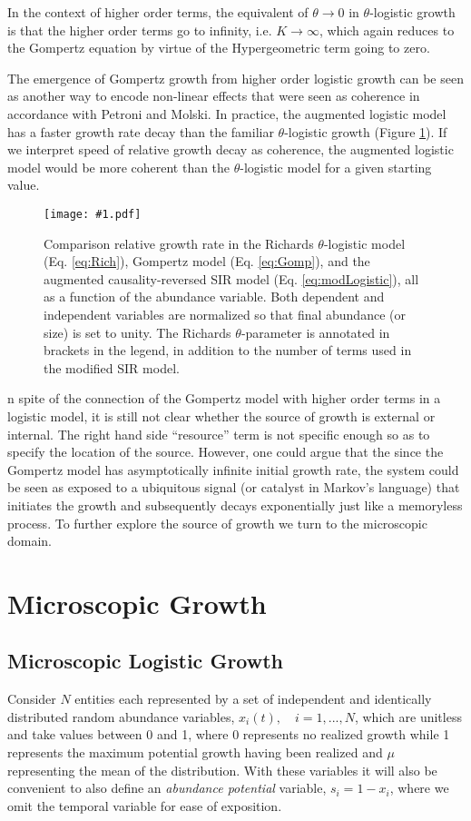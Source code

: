 \documentclass{article}
\newcommand{\insertPdfFig}[3]{
  \begin{figure}[H]
  \centering
  \texttt{[image: \#1.pdf]}
  \caption{#2}
  \label{fig:#1}
  \end{figure}
}
\begin{document}
 In the context of higher order terms, the equivalent of $\theta\rightarrow 0$ in $\theta$-logistic growth is that the higher order terms go to infinity, i.e. $K \rightarrow \infty$, which again reduces to the Gompertz equation by virtue of the Hypergeometric term going to zero. 

 The emergence of Gompertz growth from higher order logistic growth can be seen as another way to encode non-linear effects that were seen as coherence in accordance with Petroni and Molski. In practice, the augmented logistic model has a faster growth rate decay than the familiar $\theta$-logistic growth (Figure \ref{fig:hypergeometric_plain}). If we interpret speed of relative growth decay as coherence, the augmented logistic model would be more coherent than the $\theta$-logistic model for a given starting value. 

\insertPdfFig{hypergeometric_plain}{Comparison relative growth rate in the Richards $\theta$-logistic model (Eq. \ref{eq:Rich}), Gompertz model (Eq. \ref{eq:Gomp}), and the augmented causality-reversed SIR model (Eq. \ref{eq:modLogistic}), all as a function of the abundance variable. Both dependent and independent variables are normalized so that final abundance (or size) is set to unity. The Richards $\theta$-parameter is annotated in brackets in the legend, in addition to the number of terms used in the modified SIR model.} 

In spite of the connection of the Gompertz model with higher order terms in a logistic model, it is still not clear whether the source of growth is external or internal. The right hand side ``resource'' term is not specific enough so as to specify the location of the source. However, one could argue that the since the Gompertz model has asymptotically infinite initial growth rate, the system could be seen as exposed to a ubiquitous signal (or catalyst in Markov's language) that initiates the growth and subsequently decays exponentially just like a memoryless process. To further explore the source of growth we turn to the microscopic domain.

\section{Microscopic Growth}
\label{sec:micro}

\subsection{Microscopic Logistic Growth}
Consider $N$ entities each represented by a set of independent and identically distributed random abundance variables, $x_i(t), \quad i=1, ..., N$, which are unitless and take values between 0 and 1, where 0 represents no realized growth while 1 represents the maximum potential growth having been realized and $\mu$ representing the mean of the distribution. With these variables it will also be convenient to also define an \textit{abundance potential} variable, $s_i = 1 - x_i$, where we omit the temporal variable for ease of exposition.
\end{document}
